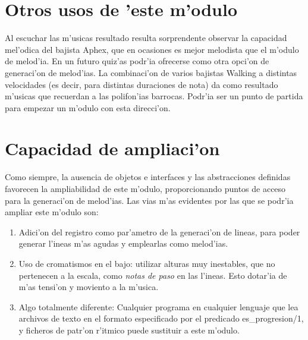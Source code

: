 \section {Otros usos de 'este m'odulo}
Al escuchar las m'usicas resultado resulta sorprendente observar la capacidad mel'odica del bajista Aphex, que en ocasiones es mejor melodista que el m'odulo de melod'ia. En un futuro quiz'as podr'ia ofrecerse como otra opci'on de generaci'on de melod'ias.
\newline
La combinaci'on de varios bajistas Walking a distintas velocidades (es decir, para distintas duraciones de nota) da como resultado m'usicas que recuerdan a las polifon'ias barrocas. Podr'ia ser un punto de partida para empezar un m'odulo con esta direcci'on.


\section {Capacidad de ampliaci'on}
Como siempre, la ausencia de objetos e interfaces y las abstracciones definidas favorecen la ampliabilidad de este m'odulo, proporcionando puntos de acceso para la generaci'on de melod'ias. Las vias m'as evidentes por las que se podr'ia ampliar este m'odulo son:
\begin{enumerate}
	\item Adici'on del registro como par'ametro de la generaci'on de lineas, para poder generar l'ineas m'as agudas y emplearlas como melod'ias.
	\item Uso de cromatismos en el bajo: utilizar alturas muy inestables, que no pertenecen a la escala, como \emph{notas de paso} en las l'ineas. Esto dotar'ia de m'as tensi'on y moviento a la m'usica.
	\item Algo totalmente diferente: Cualquier programa en cualquier lenguaje que lea archivos de texto en el formato especificado por el predicado es\_progresion/1, y ficheros de patr'on r'itmico puede sustituir a este m'odulo.
	\end{enumerate}
